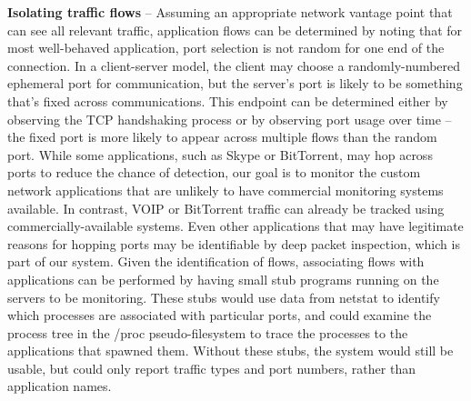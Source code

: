 {\bf Isolating traffic flows} -- Assuming an appropriate network
vantage point that can see all relevant traffic, application flows can
be determined by noting that for most well-behaved application, port
selection is not random for one end of the connection. In a
client-server model, the client may choose a randomly-numbered
ephemeral port for communication, but the server's port is likely to
be something that's fixed across communications. This endpoint can be
determined either by observing the TCP handshaking process or by
observing port usage over time -- the fixed port is more likely to
appear across multiple flows than the random port. While some
applications, such as Skype or BitTorrent, may hop across ports to
reduce the chance of detection, our goal is to monitor the custom
network applications that are unlikely to have commercial monitoring
systems available. In contrast, VOIP or BitTorrent traffic can already
be tracked using commercially-available systems. Even other
applications that may have legitimate reasons for hopping ports may be
identifiable by deep packet inspection, which is part of our
system. Given the identification of flows, associating flows with
applications can be performed by having small stub programs running on
the servers to be monitoring. These stubs would use data from netstat
to identify which processes are associated with particular ports, and
could examine the process tree in the /proc pseudo-filesystem to trace
the processes to the applications that spawned them. Without these
stubs, the system would still be usable, but could only report traffic
types and port numbers, rather than application names.

